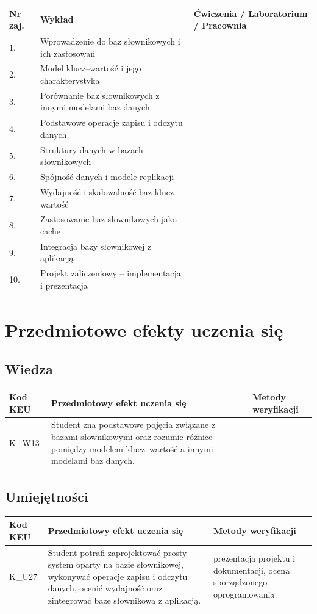 \documentclass[12pt, a4paper]{article}
\begin{document}
\begin{longtable}{|p{1.5cm}|p{6.5cm}|p{6.5cm}|}
\hline
\textbf{Nr zaj.} & \textbf{Wykład} & \textbf{Ćwiczenia / Laboratorium / Pracownia} \\\hline
\endhead
  \hline
  1. & Wprowadzenie do baz słownikowych i ich zastosowań &  \\
  \hline
  2. & Model klucz–wartość i jego charakterystyka &  \\
  \hline
  3. & Porównanie baz słownikowych z innymi modelami baz danych &  \\
  \hline
  4. & Podstawowe operacje zapisu i odczytu danych &  \\
  \hline
  5. & Struktury danych w bazach słownikowych &  \\
  \hline
  6. & Spójność danych i modele replikacji &  \\
  \hline
  7. & Wydajność i skalowalność baz klucz–wartość &  \\
  \hline
  8. & Zastosowanie baz słownikowych jako cache &  \\
  \hline
  9. & Integracja bazy słownikowej z aplikacją &  \\
  \hline
  10. & Projekt zaliczeniowy – implementacja i prezentacja &  \\
  \hline
\end{longtable}

\section{Przedmiotowe efekty uczenia się}

\subsection*{Wiedza}
\begin{longtable}{|p{1.6cm}|p{9.0cm}|p{4.2cm}|}
\hline
\rowcolor{tableHeader}
\textbf{Kod KEU} & \textbf{Przedmiotowy efekt uczenia się} & \textbf{Metody weryfikacji} \\
\endhead
  \hline
  K\_W13 & Student zna podstawowe pojęcia związane z bazami słownikowymi oraz rozumie różnice pomiędzy modelem klucz–wartość a innymi modelami baz danych. &  \\
  \hline
\end{longtable}

\subsection*{Umiejętności}
\begin{longtable}{|p{1.6cm}|p{9.0cm}|p{4.2cm}|}
\hline
\rowcolor{tableHeader}
\textbf{Kod KEU} & \textbf{Przedmiotowy efekt uczenia się} & \textbf{Metody weryfikacji} \\
\endhead
  \hline
  K\_U27 & Student potrafi zaprojektować prosty system oparty na bazie słownikowej, wykonywać operacje zapisu i odczytu danych, ocenić wydajność oraz zintegrować bazę słownikową z aplikacją. & prezentacja projektu i dokumentacji, ocena sporządzonego oprogramowania \\
  \hline
\end{longtable}
\end{document}
